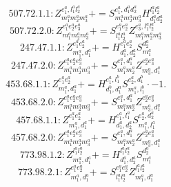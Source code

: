 \documentclass[letterpaper,10pt,fleqn,leqno,onecolumn]{article}
\begin{document}
\begin{equation} \;\;\;\;\;\;  507.72.1.1: Z^{e_{1}^{a},l_{1}^{a}l_{2}^{a}}_{m_{1}^{a}m_{2}^{a}m_{3}^{a}}+=S^{e_{1}^{a},d_{1}^{a}d_{2}^{a}}_{m_{1}^{a}m_{2}^{a}m_{3}^{a}}H^{l_{1}^{a}l_{2}^{a}}_{d_{1}^{a}d_{2}^{a}} \end{equation}
\begin{equation} \;\;\;\;\;\;  507.72.2.0: Z^{e_{1}^{a}e_{2}^{a}e_{3}^{a}}_{m_{1}^{a}m_{2}^{a}m_{3}^{a}}+=S^{e_{1}^{a}e_{2}^{a}}_{l_{1}^{a}l_{2}^{a}}Z^{e_{3}^{a},l_{1}^{a}l_{2}^{a}}_{m_{1}^{a}m_{2}^{a}m_{3}^{a}} \end{equation}
\begin{equation} \;\;\;\;\;\;  247.47.1.1: Z^{e_{1}^{a}e_{2}^{a}}_{m_{1}^{a},d_{1}^{a}}+=H^{e_{1}^{a}e_{2}^{a}}_{d_{1}^{a},d_{2}^{a}}S^{d_{2}^{a}}_{m_{1}^{a}} \end{equation}
\begin{equation} \;\;\;\;\;\;  247.47.2.0: Z^{e_{1}^{a}e_{2}^{a}e_{3}^{a}}_{m_{1}^{a}m_{2}^{a}m_{3}^{a}}+=S^{e_{1}^{a},d_{1}^{a}}_{m_{1}^{a}m_{2}^{a}}Z^{e_{2}^{a}e_{3}^{a}}_{m_{3}^{a},d_{1}^{a}} \end{equation}
\begin{equation} \;\;\;\;\;\;  453.68.1.1: Z^{e_{1}^{a}e_{2}^{a}}_{m_{1}^{a},d_{1}^{a}}+=H^{e_{1}^{a},l_{1}^{b}}_{d_{1}^{b},d_{1}^{a}}S^{e_{2}^{a},d_{1}^{b}}_{m_{1}^{a},l_{1}^{b}}\cdot -1. \end{equation}
\begin{equation} \;\;\;\;\;\;  453.68.2.0: Z^{e_{1}^{a}e_{2}^{a}e_{3}^{a}}_{m_{1}^{a}m_{2}^{a}m_{3}^{a}}+=S^{e_{1}^{a},d_{1}^{a}}_{m_{1}^{a}m_{2}^{a}}Z^{e_{2}^{a}e_{3}^{a}}_{m_{3}^{a},d_{1}^{a}} \end{equation}
\begin{equation} \;\;\;\;\;\;  457.68.1.1: Z^{e_{1}^{a}e_{2}^{a}}_{m_{1}^{a},d_{1}^{a}}+=H^{e_{1}^{a},l_{1}^{a}}_{d_{1}^{a},d_{2}^{a}}S^{e_{2}^{a},d_{2}^{a}}_{m_{1}^{a},l_{1}^{a}} \end{equation}
\begin{equation} \;\;\;\;\;\;  457.68.2.0: Z^{e_{1}^{a}e_{2}^{a}e_{3}^{a}}_{m_{1}^{a}m_{2}^{a}m_{3}^{a}}+=S^{e_{1}^{a},d_{1}^{a}}_{m_{1}^{a}m_{2}^{a}}Z^{e_{2}^{a}e_{3}^{a}}_{m_{3}^{a},d_{1}^{a}} \end{equation}
\begin{equation} \;\;\;\;\;\;  773.98.1.2: Z^{l_{1}^{a}l_{2}^{a}}_{m_{1}^{a},d_{1}^{a}}+=H^{l_{1}^{a}l_{2}^{a}}_{d_{1}^{a},d_{2}^{a}}S^{d_{2}^{a}}_{m_{1}^{a}} \end{equation}
\begin{equation} \;\;\;\;\;\;  773.98.2.1: Z^{e_{1}^{a}e_{2}^{a}}_{m_{1}^{a},d_{1}^{a}}+=S^{e_{1}^{a}e_{2}^{a}}_{l_{1}^{a}l_{2}^{a}}Z^{l_{1}^{a}l_{2}^{a}}_{m_{1}^{a},d_{1}^{a}} \end{equation}
\end{document}
